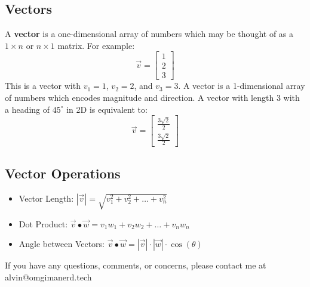 \documentclass[letterpaper, 12pt]{math}
\begin{document}
\subsection*{Vectors}
A \textbf{vector} is a one-dimensional array of numbers which may be thought
of as a \( 1\times n \) or \( n\times1 \) matrix. For example:
\[ \vec{v} = \begin{bmatrix} 1 \\ 2 \\ 3 \end{bmatrix} \]
This is a vector with \( v_{1} = 1 \), \( v_{2} = 2 \), and \( v_{3} = 3 \).
A vector is a 1-dimensional array of numbers which encodes magnitude and
direction. A vector with length 3 with a heading of \( 45^{\circ} \) in 2D
is equivalent to:
\[ \vec{v} =
  \begin{bmatrix}
    \frac{3\sqrt{2}}{2} \\
    \frac{3\sqrt{2}}{2}
  \end{bmatrix}
\]

\subsection*{Vector Operations}
\begin{itemize}
  \item Vector Length: \( |\vec{v}| =
    \sqrt{v_{1}^{2}+v_{2}^{2}+\dots+v_{n}^{2}} \)
  \item Dot Product: \( \vec{v}\bullet\vec{w} = v_{1}w_{1}+v_{2}w_{2}+\dots+
    v_{n}w_{n} \)
  \item Angle between Vectors: \( \vec{v}\bullet\vec{w} =
    |\vec{v}|\cdot|\vec{w}|\cdot\cos(\theta) \)
\end{itemize}

\begin{center}
  If you have any questions, comments, or concerns, please contact me at
  alvin@omgimanerd.tech
\end{center}
\end{document}
